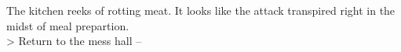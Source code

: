 The kitchen reeks of rotting meat. It looks like the attack transpired right in the midst of meal prepartion.\\

> Return to the mess hall -- 